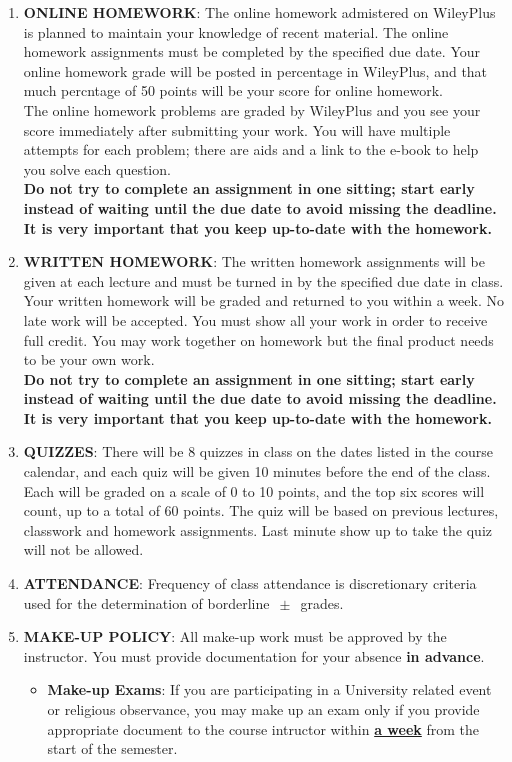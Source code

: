 \documentclass[12pt]{amsart}
\begin{document}
\begin {enumerate}
\begin {enumerate}
\item {\bf ONLINE HOMEWORK}: The online homework admistered on WileyPlus is planned to maintain your knowledge of recent material. The online homework assignments must be completed by the specified due date. Your online homework grade will be posted in percentage in WileyPlus, and that much percntage of 50 points will be your score for online homework. \\
The online homework problems are graded by WileyPlus and you see your score immediately after submitting your work. You will have multiple attempts for each problem; there are aids and a link to the e-book to help you solve each question. \\
{\bf Do not try to complete an assignment in one sitting; start early instead of waiting until the due date to avoid missing the deadline. It is very important that you keep up-to-date with the homework.}\\

\item {\bf WRITTEN HOMEWORK}: The written homework assignments will be given at each lecture and must be turned in by the specified due date in class. Your written homework will be graded and returned to you within a week. No late work will be accepted. You must show all your work in order to receive full credit. You may work together on homework but the final product needs to be your own work. \\
{\bf Do not try to complete an assignment in one sitting; start early instead of waiting until the due date to avoid missing the deadline. It is very important that you keep up-to-date with the homework.}\\

\item {\bf QUIZZES}: There will be 8 quizzes in class on the dates listed in the course calendar, and each quiz will be given 10 minutes before the end of the class. Each will be graded on a scale of 0 to 10 points, and the top six scores will count, up to a total of 60 points. The quiz will be based on previous lectures, classwork and homework assignments. Last minute show up to take the quiz will not be allowed. \\

\item {\bf ATTENDANCE}: Frequency of class attendance is discretionary criteria used for the determination of borderline  $\,\pm\,$ grades. \\ 

\item {\bf MAKE-UP POLICY}:  All make-up work must be approved by the instructor. You must provide documentation for your absence {\bf in advance}.
\begin {itemize}
\item {\bf Make-up Exams}: If you are participating in a University related event or religious observance, you may make up an exam only if you provide appropriate document to the course intructor within {\bf \underline {a week}} from the start of the semester.\\


\end{itemize}
\end{enumerate}
\end{enumerate}
\end{document}
